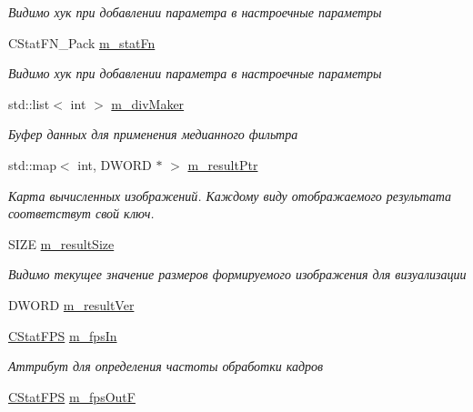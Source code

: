 \begin{DoxyCompactItemize}
\begin{DoxyCompactList}\small\item\em Видимо хук при добавлении параметра в настроечные параметры \end{DoxyCompactList}\item 
C\+Stat\+F\+N\+\_\+\+Pack \hyperlink{class_c_v_i_engine_base_a8628211a0ca23ea36cf4059f3ab47f74}{m\+\_\+stat\+Fn}
\begin{DoxyCompactList}\small\item\em Видимо хук при добавлении параметра в настроечные параметры \end{DoxyCompactList}\item 
std\+::list$<$ int $>$ \hyperlink{class_c_v_i_engine_base_a63cd16114d368eec7c2bce4c4ac8e9c8}{m\+\_\+div\+Maker}
\begin{DoxyCompactList}\small\item\em Буфер данных для применения медианного фильтра \end{DoxyCompactList}\item 
std\+::map$<$ int, D\+W\+O\+R\+D $\ast$ $>$ \hyperlink{class_c_v_i_engine_base_a34c8596778c068f60030853df3589147}{m\+\_\+result\+Ptr}
\begin{DoxyCompactList}\small\item\em Карта вычисленных изображений. Каждому виду отображаемого результата соответствут свой ключ. \end{DoxyCompactList}\item 
S\+I\+Z\+E \hyperlink{class_c_v_i_engine_base_aec00e6d3113182f3193b3b4345c4e433}{m\+\_\+result\+Size}
\begin{DoxyCompactList}\small\item\em Видимо текущее значение размеров формируемого изображения для визуализации \end{DoxyCompactList}\item 
D\+W\+O\+R\+D \hyperlink{class_c_v_i_engine_base_a756c886b931c2c905085558d219d4045}{m\+\_\+result\+Ver}
\item 
\hyperlink{class_c_stat_f_p_s}{C\+Stat\+F\+P\+S} \hyperlink{class_c_v_i_engine_base_a3f8d2ef96946316d4b11b4eef209cd35}{m\+\_\+fps\+In}
\begin{DoxyCompactList}\small\item\em Аттрибут для определения частоты обработки кадров \end{DoxyCompactList}\item 
\hyperlink{class_c_stat_f_p_s}{C\+Stat\+F\+P\+S} \hyperlink{class_c_v_i_engine_base_a68263a05d2dcb87863aac27632c6fefa}{m\+\_\+fps\+Out\+F}

\end{DoxyCompactItemize}

